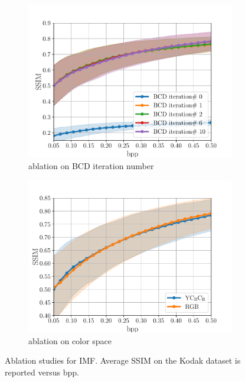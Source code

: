 \begin{figure}[t]
\begin{subfigure}{.45\textwidth}
		\includegraphics[width=.95\textwidth]{figures/ablation_iternum_ssim.pdf}
		\caption{ablation on BCD iteration number}
		\label{fig: iteration ablation ssim-vs-bpp}
	\end{subfigure}%
	\begin{subfigure}{.45\textwidth}
		\centering
		\includegraphics[width=.95\textwidth]{figures/ablation_colorspace_ssim.pdf}
		\caption{ablation on color space}
		\label{fig: colorspace ablation ssim-vs-bpp}
	\end{subfigure}
	\caption{Ablation studies for IMF. Average SSIM on the Kodak dataset is reported versus bpp. 
    }
	\label{fig: ablation studies: ssim}
\end{figure}